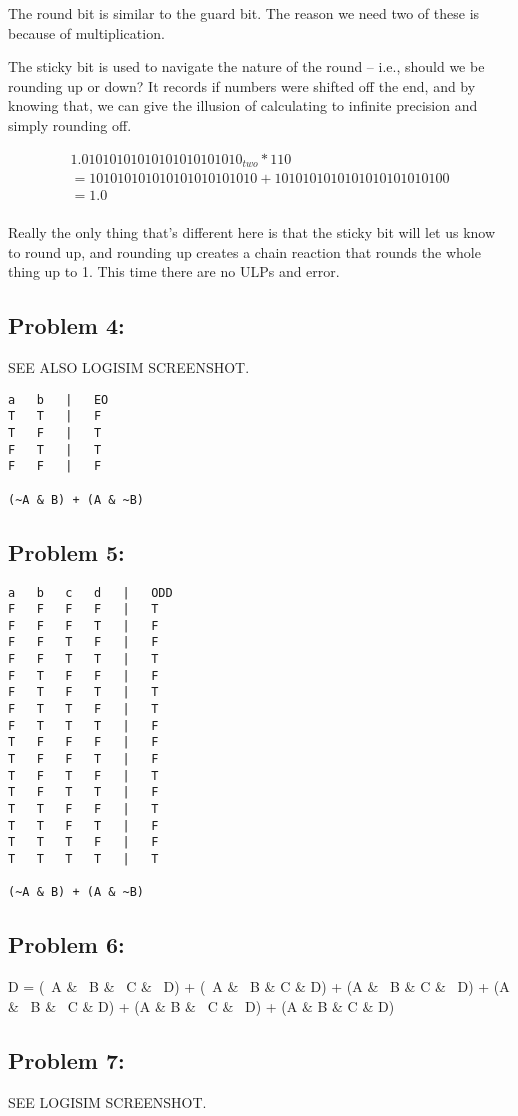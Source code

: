 \documentclass[a4paper]{article}
\begin{document}
The round bit is similar to the guard bit. The reason we need two of these is because of multiplication.

The sticky bit is used to navigate the nature of the round -- i.e., should we be rounding up or down? It records if numbers were shifted off the end, and by knowing that, we can give the illusion of calculating to infinite precision and simply rounding off.

\begin{align}
1.01010101010101010101010_{two} * 110 \\
= 101010101010101010101010 + 1010101010101010101010100 \\
= 1.0 \\
\end{align}

Really the only thing that's different here is that the sticky bit will let us know to round up, and rounding up creates a chain reaction that rounds the whole thing up to 1. This time there are no ULPs and error.

\subsection*{Problem 4:}
SEE ALSO LOGISIM SCREENSHOT.
\begin{verbatim}
a	b	|	EO
T	T	|	F
T	F	|	T
F	T	|	T
F	F	|	F

(~A & B) + (A & ~B)
\end{verbatim}

\subsection*{Problem 5:}
\begin{verbatim}
a	b	c	d	|	ODD
F	F	F	F	|	T
F	F	F	T	|	F
F	F	T	F	|	F
F	F	T	T	|	T
F	T	F	F	|	F
F	T	F	T	|	T
F	T	T	F	|	T
F	T	T	T	|	F
T	F	F	F	|	F
T	F	F	T	|	F
T	F	T	F	|	T
T	F	T	T	|	F
T	T	F	F	|	T
T	T	F	T	|	F
T	T	T	F	|	F
T	T	T	T	|	T

(~A & B) + (A & ~B)
\end{verbatim}

\subsection*{Problem 6:}
D = (~A \& ~B \& ~C \& ~D) + (~A \& ~B \& C \& D) + (A \& ~B \& C \& ~D) + (A \& ~B \& ~C \& D) + (A \& B \& ~C \& ~D) + (A \& B \& C \& D)

\subsection*{Problem 7:}
SEE LOGISIM SCREENSHOT.
\end{document}
